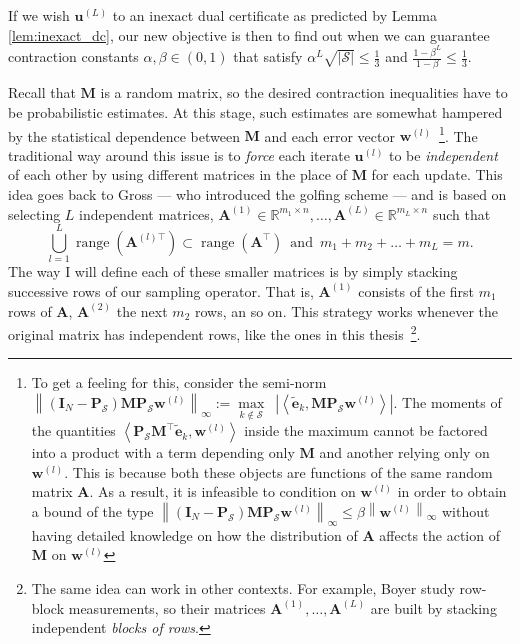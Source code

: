 \endgroup
If we wish $\mathbf{u}^{(L)}$ to an inexact dual certificate as predicted by Lemma \ref{lem:inexact_dc}, our new objective is then to find out when we can guarantee contraction constants $\alpha, \beta \in (0,1)$ that satisfy $\alpha^{L} \sqrt{|\mathcal{S}|} \leq \frac{1}{3}$ and $\frac{1 - \beta^L}{1 - \beta} \leq \frac{1}{3}$.

Recall that $\mathbf{M}$ is a random matrix, so the desired contraction inequalities have to be probabilistic estimates. At this stage, such estimates are somewhat hampered by the statistical dependence between $\mathbf{M}$ and each error vector $\mathbf{w}^{(l)}$~\footnote{To get a feeling for this, consider the semi-norm $\left \| \left(\mathbf{I}_N - \mathbf{P}_\mathcal{S}\right) \mathbf{M} \mathbf{P}_{\mathcal{S}} \mathbf{w}^{(l)} \right \|_{\infty} := \underset{k \notin \mathcal{S}}{\max} \enspace \left | \left \langle \tilde{\mathbf{e}}_k, \mathbf{M} \mathbf{P}_{\mathcal{S}} \mathbf{w}^{(l)} \right \rangle \right |$. The moments of the quantities $\left \langle \mathbf{P}_{\mathcal{S}} \mathbf{M}^\top \tilde{\mathbf{e}}_k, \mathbf{w}^{(l)} \right \rangle$
inside the maximum cannot be factored into a product with a term depending only $\mathbf{M}$ and another relying only on $\mathbf{w}^{(l)}$. This is because both these objects are functions of the same random matrix $\mathbf{A}$. As a result, it is infeasible to condition on $\mathbf{w}^{(l)}$ in order to obtain a bound of the type $\left \| \left(\mathbf{I}_N - \mathbf{P}_\mathcal{S}\right) \mathbf{M} \mathbf{P}_{\mathcal{S}} \mathbf{w}^{(l)} \right \|_{\infty} \leq \beta \left \| \mathbf{w}^{(l)} \right \|_{\infty}$ without having detailed knowledge on how the distribution of $\mathbf{A}$ affects the action of $\mathbf{M}$ on $\mathbf{w}^{(l)}$}. The traditional way around this issue is to \emph{force} each iterate $\mathbf{u}^{(l)}$ to be \emph{independent} of each other by using different matrices in the place of $\mathbf{M}$ for each update. This idea goes back to Gross \cite{gross2011} --- who introduced the golfing scheme --- and is based on selecting $L$ independent matrices, $\mathbf{A}^{(1)} \in \mathbb{R}^{m_1 \times n}, \dots, \mathbf{A}^{(L)} \in \mathbb{R}^{m_L \times n}$ such that
\begin{equation}
    \bigcup_{l=1}^{L} \operatorname{range} \left( \mathbf{A}^{(l)\top} \right) \subset \operatorname{range} \left( \mathbf{A}^{\top} \right) \enspace \text{and} \enspace m_1 + m_2 + \dots + m_L = m.
\end{equation}
The way I will define each of these smaller matrices is by simply stacking successive rows of our sampling operator. That is, $\mathbf{A}^{(1)}$ consists of the first $m_1$ rows of $\mathbf{A}$, $\mathbf{A}^{(2)}$ the next $m_2$ rows, an so on. This strategy works whenever the original matrix has independent rows, like the ones in this thesis~\footnote{The same idea can work in other contexts. For example, Boyer \etal \cite{boyer2019} study row-block measurements, so their matrices $\mathbf{A}^{(1)}, \dots, \mathbf{A}^{(L)}$ are built by stacking independent \emph{blocks of rows}.}.


